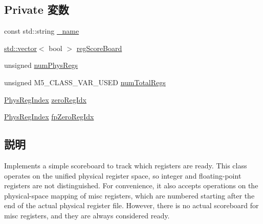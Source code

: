 \subsection*{Private 変数}
\begin{DoxyCompactItemize}
\item 
const std::string \hyperlink{classScoreboard_a1b003dc5cfce1a4d8f9a0c4b9b589045}{\_\-name}
\item 
\hyperlink{classstd_1_1vector}{std::vector}$<$ bool $>$ \hyperlink{classScoreboard_a1bbf9bd6403e6be95f85ee26ebb06ca7}{regScoreBoard}
\item 
unsigned \hyperlink{classScoreboard_a0d2a78a8e887f06150904000b2beb6cd}{numPhysRegs}
\item 
unsigned M5\_\-CLASS\_\-VAR\_\-USED \hyperlink{classScoreboard_afa56b73206d6c8a0f68cc31143205f9e}{numTotalRegs}
\item 
\hyperlink{o3_2comm_8hh_a5ec29599c4bc29a3054c451674969e7b}{PhysRegIndex} \hyperlink{classScoreboard_ad816cc199dde22b6242ff4a143f5cc19}{zeroRegIdx}
\item 
\hyperlink{o3_2comm_8hh_a5ec29599c4bc29a3054c451674969e7b}{PhysRegIndex} \hyperlink{classScoreboard_a55df2fe2fae9704590b9b50a53d48981}{fpZeroRegIdx}
\end{DoxyCompactItemize}


\subsection{説明}
Implements a simple scoreboard to track which registers are ready. This class operates on the unified physical register space, so integer and floating-\/point registers are not distinguished. For convenience, it also accepts operations on the physical-\/space mapping of misc registers, which are numbered starting after the end of the actual physical register file. However, there is no actual scoreboard for misc registers, and they are always considered ready. 

